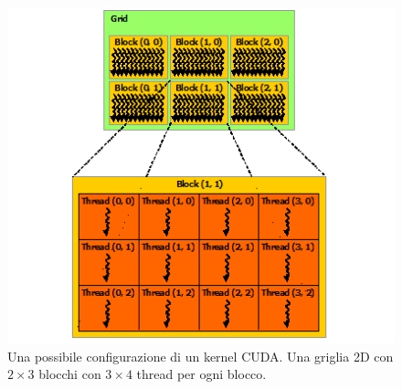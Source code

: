 \begin{figure}[h!]
    \centering
    \includegraphics[scale=0.5]{img/threads_blocks_grid.png}
    \caption{Una possibile configurazione di un kernel CUDA. Una griglia 2D con $2 \times 3$ blocchi con $3 \times 4$ thread per ogni blocco.}
    \label{fig:kernel_configuration}
\end{figure}

